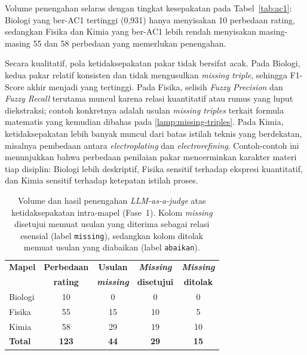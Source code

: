 \documentclass[../../thesis]{subfiles}
\begin{document}
\begin{enumerate}
  Volume penengahan selaras dengan tingkat kesepakatan pada Tabel~\ref{tab:ac1}:
  Biologi yang ber-AC1 tertinggi (0{,}931) hanya menyisakan 10 perbedaan rating,
  sedangkan Fisika dan Kimia yang ber-AC1 lebih rendah menyisakan masing-masing
  55 dan 58 perbedaan yang memerlukan penengahan.

  Secara kualitatif, pola ketidaksepakatan pakar tidak bersifat acak. Pada
  Biologi, kedua pakar relatif konsisten dan tidak mengusulkan
  \textit{missing triple}, sehingga F1-Score akhir menjadi yang tertinggi. Pada
  Fisika, selisih \textit{Fuzzy Precision} dan \textit{Fuzzy Recall} terutama
  muncul karena relasi kuantitatif atau rumus yang luput diekstraksi; contoh
  konkretnya adalah usulan \textit{missing triples} terkait formula matematis
  yang kemudian dibahas pada \ref{lamp:missing-triples}. Pada Kimia,
  ketidaksepakatan lebih banyak muncul dari batas istilah teknis yang berdekatan,
  misalnya pembedaan antara \textit{electroplating} dan
  \textit{electrorefining}. Contoh-contoh ini menunjukkan bahwa perbedaan
  penilaian pakar mencerminkan karakter materi tiap disiplin: Biologi lebih
  deskriptif, Fisika sensitif terhadap ekspresi kuantitatif, dan Kimia sensitif
  terhadap ketepatan istilah proses.
\end{enumerate}

\begin{table}[htbp]
\centering
\caption{Volume dan hasil penengahan \textit{LLM-as-a-judge} atas ketidaksepakatan
  intra-mapel (Fase~1). Kolom \textit{missing} disetujui memuat usulan yang
  diterima sebagai relasi esensial (label \texttt{missing}), sedangkan kolom
  ditolak memuat usulan yang diabaikan (label \texttt{abaikan}).}
\label{tab:llm-judge}
\begin{tabular}{@{}l c c c c@{}}
\toprule
\textbf{Mapel} & \textbf{Perbedaan} & \textbf{Usulan} & \textbf{\textit{Missing}} & \textbf{\textit{Missing}} \\
               & \textbf{rating}    & \textbf{\textit{missing}} & \textbf{disetujui} & \textbf{ditolak} \\
\midrule
Biologi     & 10  & 0  & 0  & 0  \\
Fisika      & 55  & 15 & 10 & 5  \\
Kimia       & 58  & 29 & 19 & 10 \\
\midrule
\textbf{Total} & \textbf{123} & \textbf{44} & \textbf{29} & \textbf{15} \\
\bottomrule
\end{tabular}
\end{table}
\end{document}
